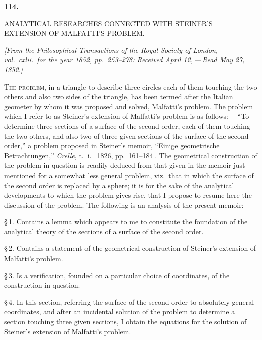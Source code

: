 \documentclass[11pt]{article}
\begin{document}
\clearpage


\begin{center}\textbf{114.}\par\medskip
{\large ANALYTICAL RESEARCHES CONNECTED WITH STEINER'S\\
EXTENSION OF MALFATTI'S PROBLEM.}
\end{center}

\noindent\emph{[From the Philosophical Transactions of the Royal Society of London, vol.\ cxlii.\ for the year 1852, pp.\ 253--278: Received April 12,\,---\,Read May 27, 1852.]}

\bigskip

\noindent\textsc{The problem,} in a triangle to describe three circles each of them touching the two others and also two sides of the triangle, has been termed after the Italian geometer by whom it was proposed and solved, Malfatti's problem. The problem which I refer to as Steiner's extension of Malfatti's problem is as follows:\,---\,``To determine three sections of a surface of the second order, each of them touching the two others, and also two of three given sections of the surface of the second order,'' a problem proposed in Steiner's memoir, ``Einige geometrische Betrachtungen,'' \emph{Crelle}, t.\ i.\ [1826, pp.\ 161--184]. The geometrical construction of the problem in question is readily deduced from that given in the memoir just mentioned for a somewhat less general problem, viz.\ that in which the surface of the second order is replaced by a sphere; it is for the sake of the analytical developments to which the problem gives rise, that I propose to resume here the discussion of the problem. The following is an analysis of the present memoir:

\smallskip
\noindent\S\,1. Contains a lemma which appears to me to constitute the foundation of the analytical theory of the sections of a surface of the second order.

\noindent\S\,2. Contains a statement of the geometrical construction of Steiner's extension of Malfatti's problem.

\noindent\S\,3. Is a verification, founded on a particular choice of coordinates, of the construction in question.

\noindent\S\,4. In this section, referring the surface of the second order to absolutely general coordinates, and after an incidental solution of the problem to determine a section touching three given sections, I obtain the equations for the solution of Steiner's extension of Malfatti's problem.
\end{document}
